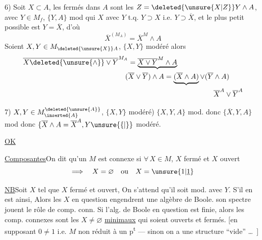 6) Soit $X\subset A$, les fermés dans $A$ sont les $Z=\deleted{\unsure{X|Z}}Y\wedge A$, avec $Y\in M_f$, $\{Y,A\}$ mod   qui  $X$   avec $Y$ t.q. $Y\supset X$ i.e. $Y\supset\overline X$, et le
plus petit possible est $Y=\overline X$, d'où 
\[
\overline X^{(M_A)}=\overline X^M\wedge A
\]
Soient $X,Y\in M_{\deleted{\unsure{X}}A}$, $\{X,Y\}$ modéré\unsure{)|,} alors
\[
\begin{aligned}
\overline{X\deleted{\unsure{\wedge}}\vee Y}^{M_A}
   &=\underbrace{\overline{X\vee Y}^M\wedge A}\\
   &\hspace{-.4em}(\overline X\vee\overline Y)\wedge A
       =\underbrace{(\overline X\wedge A)}\vee(\overline Y\wedge A)\\
   &\hspace{12em}\overline X^A\vee\overline Y^A
\end{aligned}
\]

7) $X,Y\in M_{\inserted{A}}^{\deleted{\unsure{A}}}$, $\{X,Y\}$ modéré)   $\{X,Y,A\}$ mod. donc $\{\overline X,Y,A\}$ mod donc $\{\overline X\wedge A=\overline X^A,Y\unsure{\{|\}}$ modéré.

\uline{OK}

\uline{Composantes}\qquad On dit qu'un $M$ est connexe si  $\forall\,X\in M$, $X$ fermé et $X$ ouvert
\[
\Longrightarrow\quad X=\varnothing\quad\text{ou}\quad X=\unsure{1|\underline{1}}
\]

\uline{NB}\qquad Soit $X$ tel que $X$ fermé et ouvert, On s'attend qu'il soit mod. avec  $Y$. S'il en est ainsi, Alors les $X$ en question engendrent une algèbre de Boole.    son spectre jouent le rôle de comp. conn. Si l'alg.
de Boole en question est finie, alors les comp. connexes sont les  $X\ne\varnothing$ \uline{minimaux} qui soient ouverts et fermés. [en supposant $0\ne1$
i.e. $M$ non réduit à un p\textsuperscript{t} --- sinon on a   une structure ``vide'' \ldots\ ]

